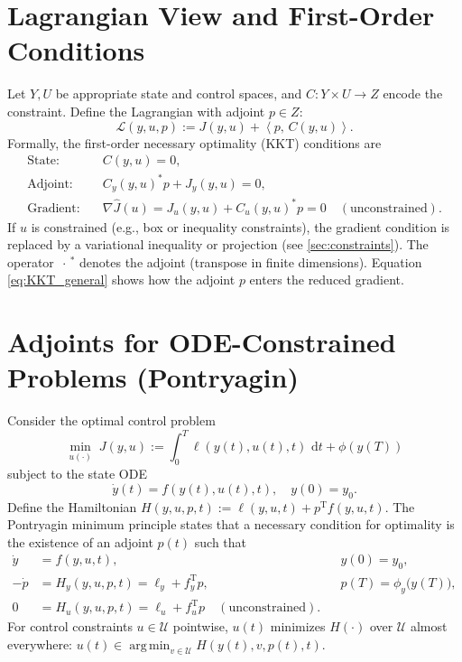 \documentclass[11pt,a4paper]{article}
\numberwithin{equation}{section}
\theoremstyle{plain}
\theoremstyle{definition}
\newcommand{\ip}[2]{\left\langle #1,\,#2 \right\rangle}
\newcommand{\td}{\,\mathrm{d}}
\newcommand{\T}{\mathrm{T}}
\DeclareMathOperator*{\argmin}{arg\,min}
\begin{document}
\section{Lagrangian View and First-Order Conditions}
Let $Y,U$ be appropriate state and control spaces, and $C:Y\times U\to Z$ encode the constraint. Define the Lagrangian with adjoint $p\in Z$:
\begin{equation}
\mathcal{L}(y,u,p) := J(y,u) + \ip{p}{C(y,u)}.
\end{equation}
Formally, the first-order necessary optimality (KKT) conditions are
\begin{subequations}\label{eq:KKT_general}
\begin{align}
\text{State:}\quad & C(y,u) = 0, \\
\text{Adjoint:}\quad & C_y(y,u)^\ast p + J_y(y,u) = 0, \\
\text{Gradient:}\quad & \nabla \hat J(u) = J_u(y,u) + C_u(y,u)^\ast p = 0 \quad (\text{unconstrained}).
\end{align}
\end{subequations}
If $u$ is constrained (e.g., box or inequality constraints), the gradient condition is replaced by a variational inequality or projection (see \cref{sec:constraints}). The operator $\,\cdot\,^\ast$ denotes the adjoint (transpose in finite dimensions). Equation \eqref{eq:KKT_general} shows how the adjoint $p$ enters the reduced gradient.

\section{Adjoints for ODE-Constrained Problems (Pontryagin)}
\label{sec:ODE}
Consider the optimal control problem
\begin{equation}
\min_{u(\cdot)} \; J(y,u) := \int_0^T \ell(y(t),u(t),t)\,\td t + \phi(y(T))
\end{equation}
subject to the state ODE
\begin{equation}
\dot y(t) = f(y(t),u(t),t), \quad y(0)=y_0.
\end{equation}
Define the Hamiltonian $H(y,u,p,t) := \ell(y,u,t) + p^\T f(y,u,t)$. The Pontryagin minimum principle states that a necessary condition for optimality is the existence of an adjoint $p(t)$ such that
\begin{subequations}\label{eq:PMP}
\begin{align}
\dot y &= f(y,u,t), && y(0)=y_0, \\
-\dot p &= H_y(y,u,p,t) = \ell_y + f_y^\T p, && p(T) = \phi_y\big(y(T)\big), \\
0 &= H_u(y,u,p,t) = \ell_u + f_u^\T p \quad (\text{unconstrained}).
\end{align}
\end{subequations}
For control constraints $u\in \mathcal U$ pointwise, $u(t)$ minimizes $H(\cdot)$ over $\mathcal U$ almost everywhere: $u(t)\in \argmin_{v\in\mathcal U} H(y(t),v,p(t),t)$.
\end{document}
